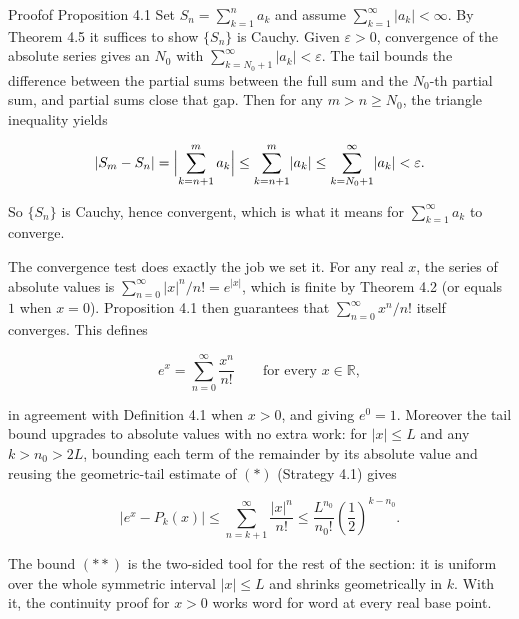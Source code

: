 \documentclass[a4paper,12pt,oneside]{memoir}
\begin{document}
\begin{envproof}{Proof}{}{of Proposition 4.1}
Set \(S_{n} = \sum_{k=1}^{n} a_{k}\) and assume \(\sum_{k=1}^{\infty} \lvert a_{k} \rvert < \infty\). By Theorem 4.5 it suffices to show \(\{S_{n}\}\) is Cauchy. Given \(\varepsilon > 0\), convergence of the absolute series gives an \(N_{0}\) with \(\sum_{k = N_{0} + 1}^{\infty} \lvert a_{k} \rvert < \varepsilon\). The tail bounds the difference between the partial sums between the full sum and the \(N_{0}\)-th partial sum, and partial sums close that gap. Then for any \(m > n \ge N_{0}\), the triangle inequality yields

\[ \lvert S_{m} - S_{n} \rvert = \Bigl\lvert \sum_{k = n + 1}^{m} a_{k} \Bigr\rvert \le \sum_{k = n + 1}^{m} \lvert a_{k} \rvert \le \sum_{k = N_{0} + 1}^{\infty} \lvert a_{k} \rvert < \varepsilon. \]

So \(\{S_{n}\}\) is Cauchy, hence convergent, which is what it means for \(\sum_{k=1}^{\infty} a_{k}\) to converge. \qedmark
\end{envproof}
The convergence test does exactly the job we set it. For any real \(x\), the series of absolute values is \(\sum_{n=0}^{\infty} \lvert x \rvert^{n}/n! = e^{\lvert x \rvert}\), which is finite by Theorem 4.2 (or equals \(1\) when \(x = 0\)). Proposition 4.1 then guarantees that \(\sum_{n=0}^{\infty} x^{n}/n!\) itself converges. This defines

\[ e^{x} = \sum_{n=0}^{\infty} \frac{x^{n}}{n!} \qquad \text{for every } x \in \mathbb{R}, \]

in agreement with Definition 4.1 when \(x > 0\), and giving \(e^{0} = 1\). Moreover the tail bound upgrades to absolute values with no extra work: for \(\lvert x \rvert \le L\) and any \(k > n_{0} > 2L\), bounding each term of the remainder by its absolute value and reusing the geometric-tail estimate of \((*)\) (Strategy 4.1) gives

\[ \lvert e^{x} - P_{k}(x) \rvert \le \sum_{n = k + 1}^{\infty} \frac{\lvert x \rvert^{n}}{n!} \le \frac{L^{n_{0}}}{n_{0}!} \left(\frac{1}{2}\right)^{k - n_{0}}. \tag{$**$} \]

The bound \((**)\) is the two-sided tool for the rest of the section: it is uniform over the whole symmetric interval \(\lvert x \rvert \le L\) and shrinks geometrically in \(k\). With it, the continuity proof for \(x > 0\) works word for word at every real base point.
\end{document}
